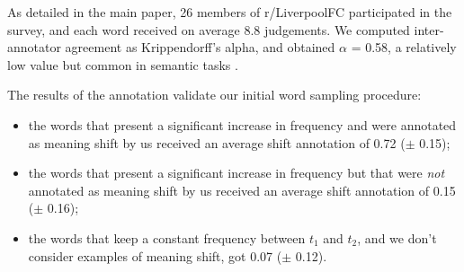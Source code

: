 \documentclass[11pt,a4paper]{article}
\begin{document}
As detailed in the main paper, 26 members of r/LiverpoolFC participated in the survey, and each word received on average 8.8 judgements. We computed inter-annotator agreement as Krippendorff's alpha, and obtained $\alpha$ = 0.58, a relatively low value but common in semantic tasks \cite{artstein2008inter}.

The results of the annotation validate our initial word sampling procedure:

\begin{itemize}
\item  the words that present a significant increase in frequency and were annotated as
meaning shift by us received an average shift annotation of 0.72 ($\pm$ 0.15);
\item the words that present a
significant increase in frequency but that were \emph{not} annotated as
meaning shift by us received an average shift annotation of  0.15 ($\pm$ 0.16);
\item the words that keep a constant frequency between $t_1$ and $t_2$, and we don't consider examples of meaning shift, got 0.07 ($\pm$ 0.12).
\end{itemize}
\end{document}
